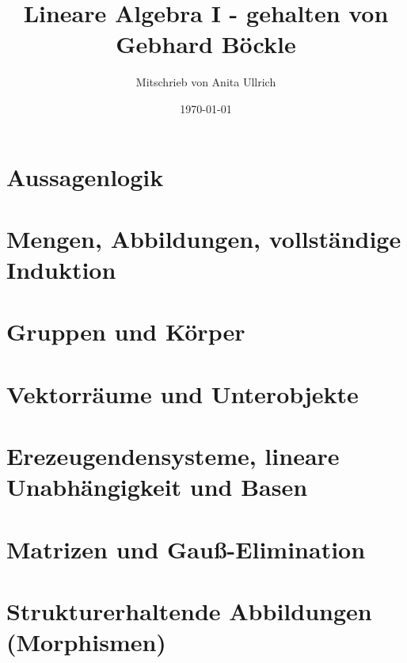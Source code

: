 \documentclass[fleqn, a4paper, 11pt]{scrartcl}
\title{Lineare Algebra I - gehalten von Gebhard Böckle}
\author{Mitschrieb von Anita Ullrich}
\date{\today}
\theoremstyle{definition}
\begin{document}
\maketitle
\tableofcontents
\newpage

\setcounter{section}{-1}

\section{Aussagenlogik}

\newpage
\section{Mengen, Abbildungen, vollständige Induktion}

\newpage
\section{Gruppen und Körper}

\newpage
\section{Vektorräume und Unterobjekte}

\newpage
\section{Erezeugendensysteme, lineare Unabhängigkeit und Basen}

\newpage
\section{Matrizen und Gauß-Elimination}

\newpage
\section{Strukturerhaltende Abbildungen (Morphismen)}
\end{document}
